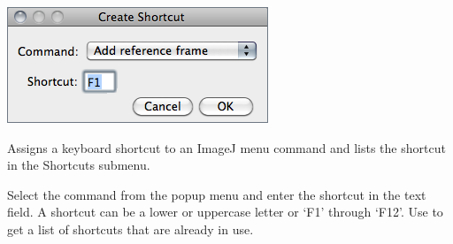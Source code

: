 

\subsubsection{\protect{}\label{sub:Create-Shortcuts...}}

\begin{minipage}[c][1\totalheight][t]{0.417\columnwidth}%
\includegraphics[scale=0.55]{images/CreateShortcut}%
\end{minipage}%
\begin{minipage}[c][1\totalheight][t]{0.583\columnwidth}%
Assigns a keyboard shortcut to an ImageJ menu command and lists the
shortcut in the Shortcuts submenu.\medskip{}


Select the command from the popup menu and enter the shortcut in the
text field. A shortcut can be a lower or uppercase letter or `F1'
through `F12'. Use {\small {}}
to get a list of shortcuts that are already in use.%
\end{minipage}


\subsubsection{\protect{}\label{sub:Install-Plugin...}}

